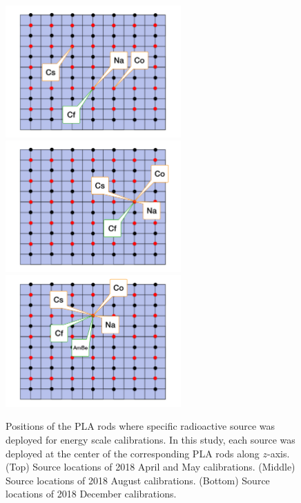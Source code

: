 \FloatBarrier
\begin{figure}[h!]
\centering
\includegraphics[width=0.6\textwidth]{Figures/CalibMapApril.pdf}\\
\includegraphics[width=0.6\textwidth]{Figures/CalibMapAug.pdf}\\
\includegraphics[width=0.6\textwidth]{Figures/CalibMapDec.pdf}
\caption[Positions of the PLA rods used for energy scale calibration runs]{Positions of the PLA rods where specific radioactive source was deployed for energy scale calibrations. 
In this study, each source was deployed at the center of the corresponding PLA rods along $z$-axis.
(Top) Source locations of 2018 April and May calibrations. 
(Middle) Source locations of 2018 August calibrations. 
(Bottom) Source locations of 2018 December calibrations. }
\label{fig:CalibMap}
\end{figure}
\FloatBarrier

